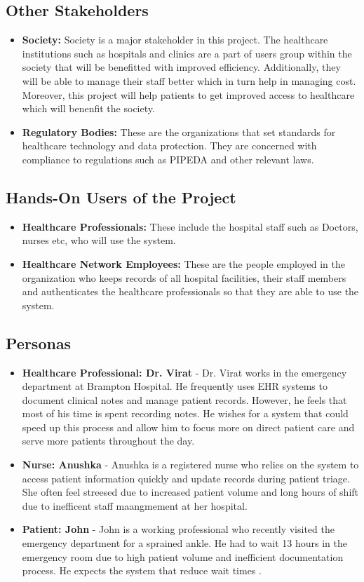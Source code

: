 \documentclass[12pt]{article}
\begin{document}
\subsection{Other Stakeholders}
\begin{itemize}
  \item \textbf{Society:} Society is a major stakeholder in this project. The healthcare institutions such as hospitals and clinics are a part of users group within the society that will be benefitted with improved efficiency. Additionally, they will be able to manage their staff better which in turn help in managing cost. Moreover, this project will help patients to get improved access to healthcare which will benenfit the society. 
  \item \textbf{Regulatory Bodies:} These are  the organizations that set standards for healthcare technology and data protection. They are concerned with compliance to regulations such as PIPEDA and other relevant laws.
\end{itemize}

\subsection{Hands-On Users of the Project}
\begin{itemize}
  \item\textbf{Healthcare Professionals:} These include the hospital staff such as Doctors, nurses etc, who will use the system.
  \item\textbf{Healthcare Network Employees:} These are the people employed in the organization who keeps records of all hospital facilities, their staff members and authenticates the healthcare professionals so that they are able to use the system. 
\end{itemize}

\subsection{Personas}
\begin{itemize}
    \item \textbf{Healthcare Professional: Dr. Virat} - Dr. Virat works in the emergency department at Brampton Hospital. He frequently uses EHR systems to document clinical notes and manage patient records. However, he feels that most of his time is spent recording notes. He wishes for a system that could speed up this process and allow him to focus more on direct patient care and serve more patients throughout the day.
    \item \textbf{Nurse: Anushka} - Anushka is a registered nurse who relies on the system to access patient information quickly and update records during patient triage. She often feel streesed due to increased patient volume and long hours of shift due to inefficent staff maangmement at her hospital.
    \item \textbf{Patient: John} - John is a working professional who recently visited the emergency department for a sprained ankle. He had to wait 13 hours in the emergency room due to high patient volume and inefficient documentation process. He expects the system that reduce wait times .
\end{itemize}
\end{document}

